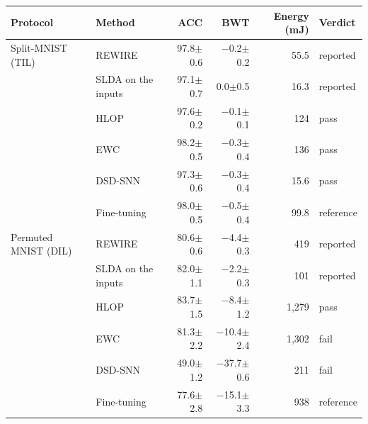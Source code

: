 \begin{tabular}{llrrrl}
\toprule
Protocol & Method & ACC & BWT & Energy (mJ) & Verdict \\
\midrule
Split-MNIST (TIL) & REWIRE & 97.8$\pm$0.6 & \ensuremath{-}0.2$\pm$0.2 & 55.5 & reported \\
 & SLDA on the inputs & 97.1$\pm$0.7 & 0.0$\pm$0.5 & 16.3 & reported \\
 & HLOP & 97.6$\pm$0.2 & \ensuremath{-}0.1$\pm$0.1 & 124 & pass \\
 & EWC & 98.2$\pm$0.5 & \ensuremath{-}0.3$\pm$0.4 & 136 & pass \\
 & DSD-SNN & 97.3$\pm$0.6 & \ensuremath{-}0.3$\pm$0.4 & 15.6 & pass \\
 & Fine-tuning & 98.0$\pm$0.5 & \ensuremath{-}0.5$\pm$0.4 & 99.8 & reference \\
\midrule
Permuted MNIST (DIL) & REWIRE & 80.6$\pm$0.6 & \ensuremath{-}4.4$\pm$0.3 & 419 & reported \\
 & SLDA on the inputs & 82.0$\pm$1.1 & \ensuremath{-}2.2$\pm$0.3 & 101 & reported \\
 & HLOP & 83.7$\pm$1.5 & \ensuremath{-}8.4$\pm$1.2 & 1,279 & pass \\
 & EWC & 81.3$\pm$2.2 & \ensuremath{-}10.4$\pm$2.4 & 1,302 & fail \\
 & DSD-SNN & 49.0$\pm$1.2 & \ensuremath{-}37.7$\pm$0.6 & 211 & fail \\
 & Fine-tuning & 77.6$\pm$2.8 & \ensuremath{-}15.1$\pm$3.3 & 938 & reference \\
\bottomrule
\end{tabular}
